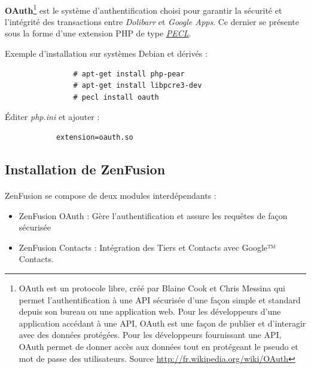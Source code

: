 \documentclass[12pt,a4paper,titlepage]{article}
\begin{document}
		\paragraph{}
			\textbf{OAuth}\footnote{OAuth est un protocole libre, créé par Blaine Cook et Chris Messina qui permet l'authentification à une API sécurisée d'une façon simple et standard depuis son bureau ou une application web. Pour les développeurs d'une application accédant à une API, OAuth est une façon de publier et d'interagir avec des données protégées. Pour les développeurs fournissant une API, OAuth permet de donner accès aux données tout en protégeant le pseudo et mot de passe des utilisateurs. Source \url{http://fr.wikipedia.org/wiki/OAuth}} est le système d'authentification choisi pour garantir la sécurité et l'intégrité des transactions entre \emph{Dolibarr} et \emph{Google Apps}. Ce dernier se présente sous la forme d'une extension PHP de type \emph{\href{pecl.php.net}{PECL}}.
			
			\bigskip
			
			Exemple d'installation sur systèmes Debian et dérivés :
			
			\begin{verbatim}
				# apt-get install php-pear
				# apt-get install libpcre3-dev
				# pecl install oauth
			\end{verbatim}
			
			Éditer \emph{php.ini} et ajouter :
			\begin{verbatim}
			extension=oauth.so
			\end{verbatim}
		
	\subsection{Installation de ZenFusion}
	
		\paragraph{}
		ZenFusion se compose de deux modules interdépendants : 
		
		\begin{itemize}
		\item ZenFusion OAuth : Gère l'authentification et assure les requêtes de façon sécurisée
		\item ZenFusion Contacts : Intégration des Tiers et Contacts avec Google™ Contacts.
		\end{itemize}
		
\end{document}
